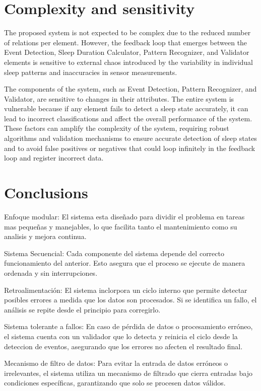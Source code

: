 \documentclass[conference]{IEEEtran}
\begin{document}
\section{Complexity and sensitivity}
The proposed system is not expected to be complex due to the reduced number of relations per element. However, the feedback 
loop that emerges between the Event Detection, Sleep Duration Calculator, Pattern Recognizer, and Validator elements is sensitive to 
external chaos introduced by the variability in individual sleep patterns and inaccuracies in sensor measurements. 

The components of the system, such as Event Detection, Pattern Recognizer, and Validator, are sensitive to changes in their attributes. The entire system is vulnerable because if any element
fails to detect a sleep state accurately, it can lead to incorrect classifications and affect the overall performance of the system.
These factors can amplify the complexity of the system, requiring robust algorithms and validation mechanisms to ensure accurate
detection of sleep states and to avoid false positives or negatives that could loop infinitely in the feedback loop and register incorrect
data.

\section{Conclusions}

Enfoque modular: 
El sistema esta diseñado para dividir el problema en tareas mas pequeñas y manejables, lo que facilita tanto el mantenimiento como su analisis y mejora continua.

Sistema Secuencial:
Cada componente del sistema depende del correcto funcionamiento del anterior. Esto asegura que el proceso se ejecute de manera ordenada y sin interrupciones.

Retroalimentación:
El sistema inclorpora un ciclo interno que permite detectar posibles errores a medida que los datos son procesados. Si se identifica un fallo, el análisis se repite desde el principio para corregirlo.

Sistema tolerante a fallos:
En caso de pérdida de datos o procesamiento erróneo, el sistema cuenta con un validador que lo detecta y reinicia el ciclo desde la deteccion de eventos, asegurando que los errores no afecten el resultado final.

Mecanismo de filtro de datos:
Para evitar la entrada de datos erróneos o irrelevantes, el sistema utiliza un mecanismo de filtrado que cierra entradas bajo condiciones específicas, garantizando que solo se procesen datos válidos.
\end{document}

